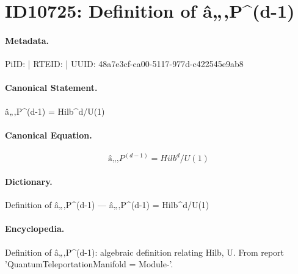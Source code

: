 \section*{ID10725: Definition of â„‚P\textasciicircum{}(d-1)}
\paragraph{Metadata.}
PiID:  | RTEID:  | UUID: 48a7e3cf-ca00-5117-977d-c422545e9ab8

\paragraph{Canonical Statement.}
â„‚P\textasciicircum{}(d-1) = Hilb\textasciicircum{}d/U(1)

\paragraph{Canonical Equation.}
\[
â„‚P^(d-1) = Hilb^d/U(1)
\]

\paragraph{Dictionary.}
Definition of â„‚P\textasciicircum{}(d-1) — â„‚P\textasciicircum{}(d-1) = Hilb\textasciicircum{}d/U(1)

\paragraph{Encyclopedia.}
Definition of â„‚P\textasciicircum{}(d-1): algebraic definition relating Hilb, U. From report 'QuantumTeleportationManifold = Module-'.
